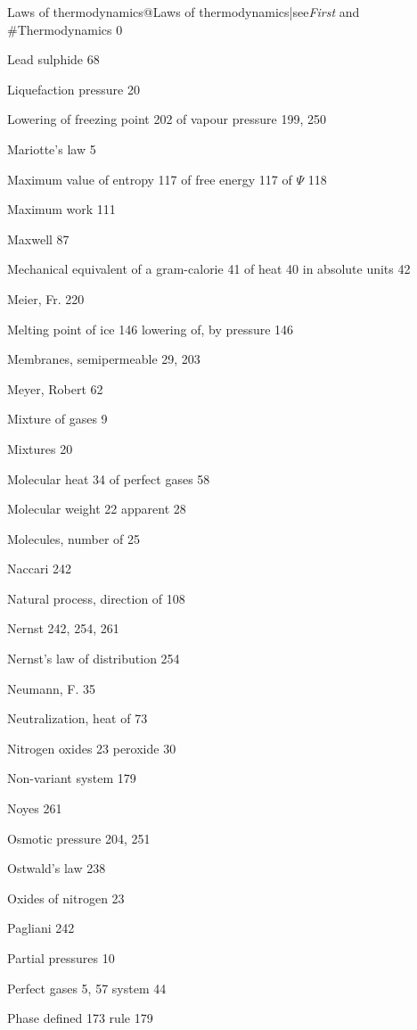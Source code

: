 \documentclass[12pt]{book}[2005/09/16]
\begin{document}
Laws of thermodynamics@Laws of thermodynamics|see{\textit{First} and }#Thermodynamics 0

Lead sulphide 68

Liquefaction pressure 20

Lowering
  of freezing point 202
  of vapour pressure 199, 250



Mariotte's law 5

Maximum value
  of entropy 117
  of free energy 117
  of $\Psi$ 118

Maximum work 111

Maxwell 87

Mechanical equivalent
  of a gram-calorie 41
  of heat 40
    in absolute units 42

Meier, Fr. 220

Melting point of ice 146
  lowering of, by pressure 146

Membranes, semipermeable 29, 203

Meyer, Robert 62

Mixture of gases 9

Mixtures 20

Molecular heat 34
  of perfect gases 58

Molecular weight 22
  apparent 28

Molecules, number of 25



Naccari 242

Natural process, direction of 108

Nernst 242, 254, 261

Nernst's law of distribution 254

Neumann, F. 35

Neutralization, heat of 73

Nitrogen
  oxides 23
  peroxide 30

Non-variant system 179

Noyes 261



Osmotic pressure 204, 251

Ostwald's law 238

Oxides of nitrogen 23



Pagliani 242

Partial pressures 10

Perfect gases 5, 57
  system 44

Phase
  defined 173
  rule 179
\end{document}
